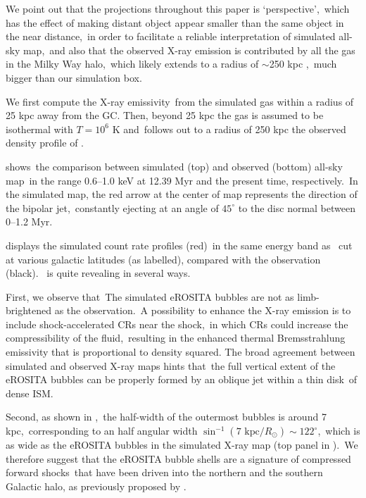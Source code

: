 \documentclass[twocolumn]{aastex631}
\begin{document}
  We point out that the projections throughout this paper is \lq perspective\rq,\
  which has the effect of making distant object appear smaller than the same object in the near distance,\
  in order to facilitate a reliable interpretation of simulated all-sky map,\
  and also that the observed X-ray emission is contributed by all the gas in the Milky Way halo,\
  which likely extends to a radius of $\sim$250 kpc \citep{halo-radius-1,halo-radius-2},\
  much bigger than our simulation box.

  We first compute the X-ray emissivity\
  from the simulated gas within a radius of 25 kpc away from the GC.
  Then, beyond 25 kpc the gas is assumed to be isothermal with $T=10^6$ K and\
  follows out to a radius of 250 kpc the observed density profile of \citep{temperature-MW}.

   shows\
  the comparison between simulated (top) and observed (bottom) all-sky map\
  in the range 0.6--1.0 keV at 12.39 Myr and the present time, respectively.\
  In the simulated map, the red arrow at the center of map represents the direction of the bipolar jet,\
  constantly ejecting at an angle of $45^{\circ}$ to the disc normal between 0--1.2 Myr.

  \Cref{fig__x-ray-profile-0.8keV-000} displays the simulated count rate profiles (red)\
  in the same energy band as \Cref{fig__xray_0.8keV_angle_000}\
  cut at various galactic latitudes (as labelled), compared with the observation (black).\
   is quite revealing in several ways.\

  First, we observe that\
  The simulated eROSITA bubbles are not as limb-brightened as the observation.\
  A possibility to enhance the X-ray emission is to include shock-accelerated CRs near the shock,\
  in which CRs could increase the compressibility of the fluid,\
  resulting in the enhanced thermal Bremsstrahlung emissivity that is proportional to density squared.
  The broad agreement between simulated and observed X-ray maps hints that\
  the full vertical extent of the eROSITA bubbles can be properly formed by an oblique jet within a thin disk\
  of dense ISM.

  Second, as shown in ,\
  the half-width of the outermost bubbles is around 7 kpc,\
  corresponding to an half angular width $\sin^{-1}(7 \text{ kpc}/R_{\odot})\sim122^{\circ}$,\
  which is as wide as the eROSITA bubbles in the simulated X-ray map (top panel in ).\
  We therefore suggest that the eROSITA bubble shells are a signature of compressed forward shocks\
  that have been driven into the northern and the southern Galactic halo,
  as previously proposed by \citet{Predehl2020}.
\end{document}
